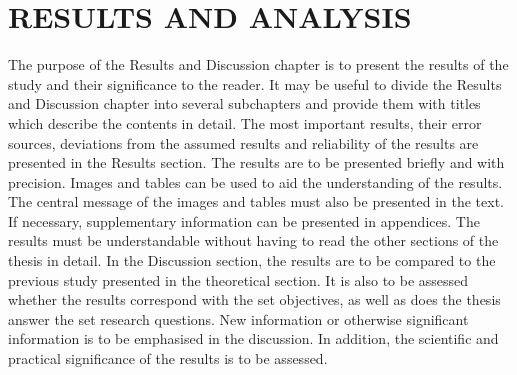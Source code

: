 \chapter{RESULTS AND ANALYSIS}

The purpose of the Results and Discussion chapter is to present the results of the study 
and  their  significance  to  the  reader.  It  may  be  useful  to  divide  the  Results  and 
Discussion chapter into several subchapters and provide them with titles which describe 
the contents in detail.  
The most important results, their error sources, deviations from the assumed results 
and reliability of the results are presented in the Results section. The results are to be presented  briefly  and  with  precision.  Images  and  tables  can  be  used  to  aid  the 
understanding of the results. The central message of the images and tables must also be 
presented  in  the  text.  If  necessary,  supplementary  information  can  be  presented  in 
appendices.  The  results  must  be  understandable  without  having  to  read  the  other 
sections of the thesis in detail. 
In  the  Discussion  section,  the  results  are  to  be  compared  to  the  previous  study 
presented  in  the  theoretical  section.  It  is  also  to  be  assessed  whether  the  results 
correspond  with  the  set  objectives,  as  well  as  does  the  thesis  answer  the  set  research 
questions. New information or otherwise significant information is to be emphasised in 
the discussion. In addition, the scientific and practical significance of the results is to be 
assessed. 